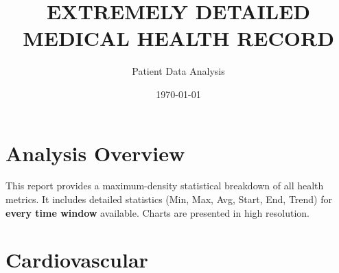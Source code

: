 \documentclass{article}
\title{\textbf{EXTREMELY DETAILED MEDICAL HEALTH RECORD}}
\author{Patient Data Analysis}
\date{\today}
\begin{document}
\maketitle

\section*{Analysis Overview}
This report provides a maximum-density statistical breakdown of all health metrics.
It includes detailed statistics (Min, Max, Avg, Start, End, Trend) for \textbf{every time window} available.
Charts are presented in high resolution.

\tableofcontents
\newpage
\section{Cardiovascular}
\end{document}
